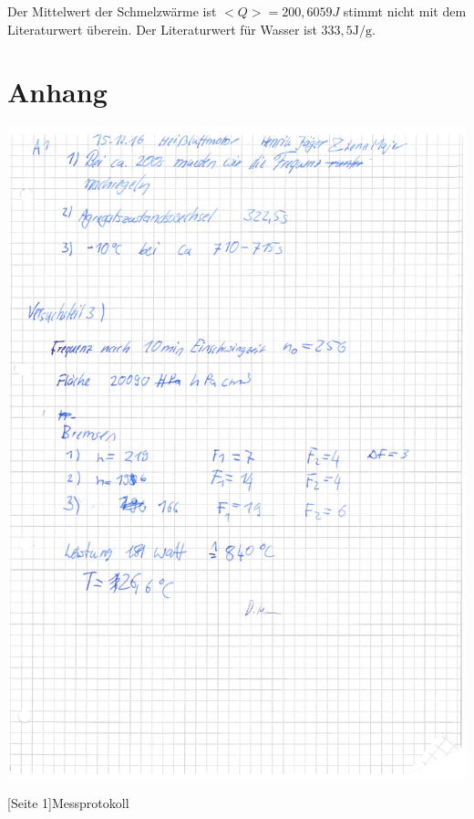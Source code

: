 \documentclass[12pt,a4paper]{scrartcl}
\begin{document}
    Der Mittelwert der Schmelzwärme ist $<Q> = 200,6059 J$ stimmt nicht mit dem Literaturwert überein.
    Der Literaturwert für Wasser ist $333,5 \si{\joule\per\gram}$.

	\section{Anhang}
    	\begin{center}
    		\includegraphics[scale=0.65]{1.pdf}
    	\end{center}
    	[Seite 1]{Messprotokoll}
	\pagebreak
\end{document}
